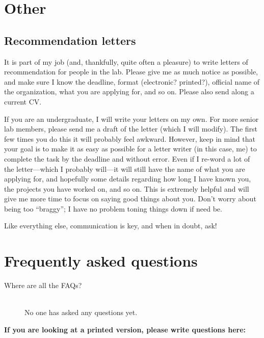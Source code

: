 \documentclass[letterpaper,12pt,oneside]{memoir}
\begin{document}
\chapter{Other}
\section{Recommendation letters}
It is part of my job (and, thankfully, quite often a pleasure) to write letters of recommendation for people in the lab. Please give me as much notice as possible, and make sure I know the deadline, format (electronic? printed?), official name of the organization, what you are applying for, and so on. Please also send along a current CV.

If you are an undergraduate, I will write your letters on my own. For more senior lab members, please send me a draft of the letter (which I will modify). The first few times you do this it will probably feel awkward. However, keep in mind that your goal is to make it as easy as possible for a letter writer (in this case, me) to complete the task by the deadline and without error. Even if I re-word a lot of the letter---which I probably will---it will still have the name of what you are applying for, and hopefully some details regarding how long I have known you, the projects you have worked on, and so on. This is extremely helpful and will give me more time to focus on saying good things about you. Don't worry about being too ``braggy''; I have no problem toning things down if need be.

Like everything else, communication is key, and when in doubt, ask!

\chapter{Frequently asked questions}

\begin{description}
\item[Where are all the FAQs?] \hfill \\
No one has asked any questions yet.


\end{description}

\vspace{.2in}
\noindent \textbf{\large If you are looking at a printed version, please write questions here:}


%
\end{document}
